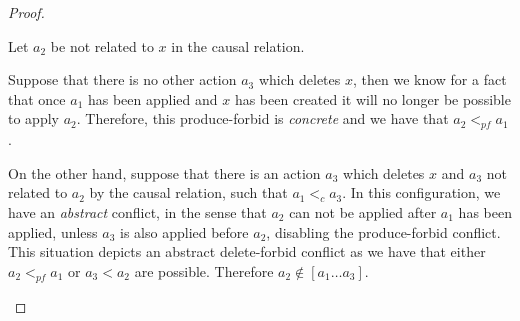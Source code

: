 \begin{proof}
\begin{description}[style=nextline,leftmargin=*]
  \item[Triggering element is not related to the action:]
    Let $a_2$ be not related to $x$ in the causal relation.

    Suppose that there is no other action $a_3$ which deletes $x$, then we know for a fact that once $a_1$ has been applied and $x$ has been created it will no longer be possible to apply $a_2$. Therefore, this produce-forbid is \emph{concrete} and we have that $a_2 <_{pf} a_1$.

    On the other hand, suppose that there is an action $a_3$ which deletes $x$ and $a_3$ not related to $a_2$ by the causal relation, such that $a_1 <_c a_3$. In this configuration, we have an \emph{abstract} conflict, in the sense that $a_2$ can not be applied after $a_1$ has been applied, unless $a_3$ is also applied before $a_2$, disabling the produce-forbid conflict. This situation depicts an abstract delete-forbid conflict as we have that either \mbox{$a_2 <_{pf} a_1$} or \mbox{$a_3 < a_2$}
    are possible. Therefore \mbox{$a_2 \not\in [a_1\ldots a_3]$}.
\end{description}
\end{proof}


